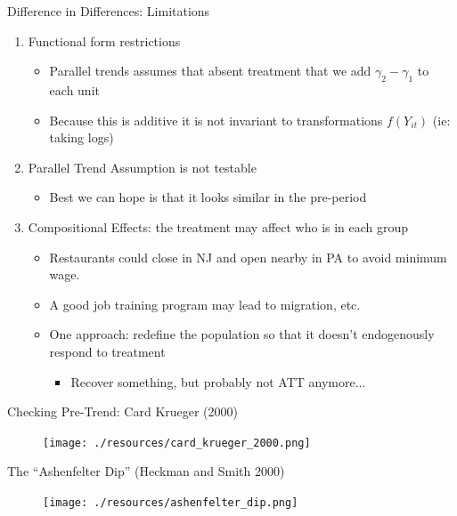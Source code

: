 \begin{frame}{Difference in Differences: Limitations}
\begin{enumerate}
\item Functional form restrictions
\begin{itemize}
\item \alert{Parallel trends} assumes that absent treatment that we add $\gamma_2 - \gamma_1$ to each unit
\item Because this is \alert{additive} it is not invariant to transformations $f(Y_{it})$ (ie: taking logs)
\end{itemize}
\item Parallel Trend Assumption is \alert{not testable}
\begin{itemize}
\item Best we can hope is that it looks similar in the pre-period
\end{itemize}
\item Compositional Effects: the treatment may affect who is in each group
\begin{itemize}
\item Restaurants could close in NJ and open nearby in PA to avoid minimum wage.
\item A good job training program may lead to migration, etc.
\item One approach: redefine the population so that it doesn't endogenously respond to treatment
\begin{itemize}
\item Recover something, but probably not ATT anymore...
\end{itemize}
\end{itemize}
\end{enumerate}

\end{frame}

\begin{frame}{Checking Pre-Trend: Card Krueger (2000)}
\begin{figure}
\centering
\texttt{[image: ./resources/card\_krueger\_2000.png]}
\end{figure}
\end{frame}

\begin{frame}{The ``Ashenfelter Dip'' (Heckman and Smith 2000)}
\begin{figure}
\centering
\texttt{[image: ./resources/ashenfelter\_dip.png]}
\end{figure}
\end{frame}


